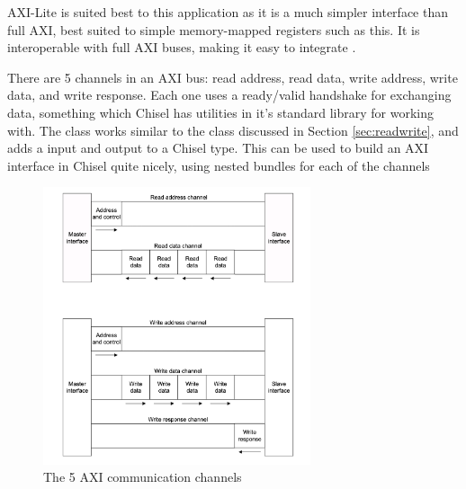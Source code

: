 AXI-Lite is suited best to this application as it is a much simpler interface than full AXI, best suited to simple memory-mapped registers such as this. It is interoperable with full AXI buses, making it easy to integrate \cite{axi}.

There are 5 channels in an AXI bus: read address, read data, write address, write data, and write response. Each one uses a ready/valid handshake for exchanging data, something which Chisel has utilities in it's standard library for working with. The  class works similar to the  class discussed in Section \ref{sec:readwrite}, and adds a  input and  output to a Chisel  type. This can be used to build an AXI interface in Chisel quite nicely, using nested bundles for each of the channels

\begin{figure}[H]
    \centering
    \includegraphics[width=0.7\textwidth]{../img/axi-chan.png}
    \caption{The 5 AXI communication channels}
    \label{fig:axi-chan}
\end{figure}

